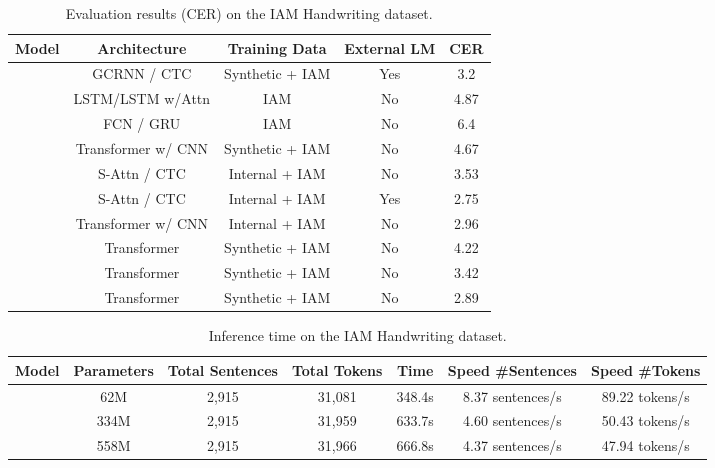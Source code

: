 \documentclass[letterpaper]{article} \usepackage{aaai23}  \usepackage{times}  \usepackage{helvet}  \usepackage{courier}  \usepackage[hyphens]{url}  \usepackage{graphicx} \urlstyle{rm} \def\UrlFont{\rm}  \usepackage{natbib}  \usepackage{caption} \frenchspacing  \setlength{\pdfpagewidth}{8.5in} \setlength{\pdfpageheight}{11in} \usepackage{algorithm}
\begin{document}
\begin{table*}[ht]
\centering
\begin{tabular}{ccccc}
\hline
\textbf{Model}      &\textbf{Architecture}             & \textbf{Training Data}   & \textbf{External LM} & \textbf{CER} \\ \hline

\cite{bluche2017gated}   &   GCRNN / CTC     & Synthetic + IAM          & Yes                  & 3.2          \\
\cite{michael2019evaluating}& LSTM/LSTM w/Attn  & IAM                      & No                   & 4.87         \\ 
\cite{wang2020decoupled}  &    FCN / GRU    & IAM                      & No                   & 6.4          \\

\cite{kang2020pay}      &    Transformer w/ CNN     & Synthetic + IAM          & No                   & 4.67         \\

\cite{diaz2021rethinking} & S-Attn / CTC      & Internal + IAM           & No                  & 3.53      \\
\cite{diaz2021rethinking}  &  S-Attn / CTC    & Internal + IAM          & Yes                  & 2.75         \\
\cite{diaz2021rethinking}  &  Transformer w/ CNN    & Internal + IAM          & No                  & 2.96         \\
\hline
            &  Transformer        & Synthetic + IAM          & No                   & 4.22             \\
             &  Transformer        & Synthetic + IAM          & No                   & 3.42             \\
             &   Transformer      & Synthetic + IAM          & No                   & 2.89             \\
\hline
\end{tabular}
\caption{Evaluation results (CER) on the IAM Handwriting dataset.}
\label{tab:iam}
\end{table*}


\begin{table*}
\centering
\begin{tabular}{ccccccc}\hline
\textbf{Model}       & \textbf{Parameters} & \textbf{Total Sentences} & \textbf{Total Tokens} & \textbf{Time}   & \textbf{Speed \#Sentences} & \textbf{Speed \#Tokens} \\
\hline
 & 62M  & 2,915           & 31,081       & 348.4s & 8.37 sentences/s  & 89.22 tokens/s \\
  & 334M & 2,915           & 31,959       & 633.7s & 4.60 sentences/s  & 50.43 tokens/s \\
 & 558M & 2,915           & 31,966       & 666.8s & 4.37 sentences/s  & 47.94 tokens/s \\
\hline
\end{tabular}
\caption{Inference time on the IAM Handwriting dataset.}
\label{tab:infer}
\end{table*}
\end{document}
